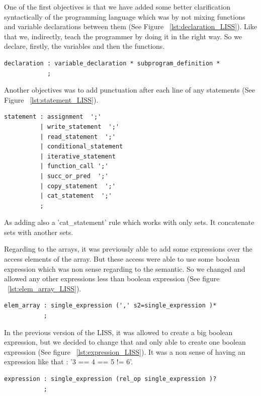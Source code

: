 \documentclass[
  oneside,
  11pt, a4paper,
  footinclude=true,
  headinclude=true,
  cleardoublepage=empty
]{scrbook}
\begin{document}

One of the first objectives is that we have added some better clarification syntactically of the programming language which was by not mixing functions and variable declarations between them (See Figure ~\ref{lst:declaration_LISS}).
Like that we, indirectly, teach the programmer by doing it in the right way. So we declare, firstly, the variables and then the functions.
\begin{lstlisting}[caption={},label={lst:declaration_LISS}]
declaration : variable_declaration * subprogram_definition *
            ;
\end{lstlisting}

Another objectives was to add punctuation after each line of any statements (See Figure ~\ref{lst:statement_LISS}).
\begin{lstlisting}[caption={Function statement},label={lst:statement_LISS}]
statement : assignment  ';'
          | write_statement  ';'
          | read_statement  ';'
          | conditional_statement
          | iterative_statement
          | function_call ';'
          | succ_or_pred  ';'
          | copy_statement  ';'
          | cat_statement  ';'
          ;
\end{lstlisting}

As adding also a 'cat\_statement' rule which works with only sets. It concatenate sets with another sets.

Regarding to the arrays, it was previously able to add some expressions over the access elements of the array. But these access were able to use some boolean expression which was non sense regarding to the semantic. So we changed and allowed any other expressions less than boolean expression (See figure ~\ref{lst:elem_array_LISS}).


\begin{lstlisting}[caption={Rule element of array},label={lst:elem_array_LISS}]
elem_array : single_expression (',' s2=single_expression )*
           ;
\end{lstlisting}

In the previous version of the LISS, it was allowed to create a big boolean expression, but we decided to change that and only able to create one boolean expression (See figure ~\ref{lst:expression_LISS}).
It was a non sense of having an expression like that : '3 == 4 == 5 != 6'.
\begin{lstlisting}[caption={Rule expression},label={lst:expression_LISS}]
expression : single_expression (rel_op single_expression )?
           ;
\end{lstlisting}
\end{document}
